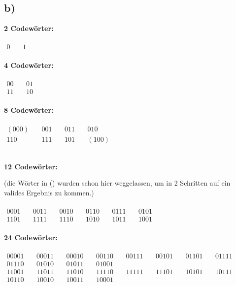 \documentclass[a4paper]{scrartcl}
\begin{document}
	\subsection{b)}
		\textbf{2 Codewörter:} \\ \\
		\(
		\begin{array}{ccc}
			0&\ & 1
		\end{array}
		\)\\ \\
		\textbf{4 Codewörter:} \\ \\
		\(
		\begin{array}{ccc}
			00&\ & 01 \\
			11&\ & 10 
		\end{array}
		\)\\ \\
		\textbf{8 Codewörter:} \\ \\
		\(
		\begin{array}{ccccccc}
			(000)&\ & 001 &\ & 011&\ & 010 \\
			110&\ & 111 &\ & 101&\ & (100) 
		\end{array}
		\)\\ \\
		\newpage
		\begin{flushleft}
			\textbf{12 Codewörter:} \\
		\end{flushleft}		
		(die Wörter in () wurden schon hier weggelassen, um in 2 Schritten 
		auf ein valides Ergebnis zu kommen.) \\ \\
		\(
		\begin{array}{ccccccccccccc}
			0001&\ & 0011&\	& 0010 &\ & 0110&\ &0111&\ & 0101 \\
			1101&\ & 1111&\ & 1110 &\ & 1010&\ &1011&\ & 1001
		\end{array}
		\)\\ \\
		\textbf{24 Codewörter:} \\ \\
		\(
		\begin{array}{cccccccccccccccccccccccccccccccccccccc}
			00001&\ &00011&\ &00010&\ &00110&\ &00111&\ &00101&\ &01101&\ &01111 \\
			01110&\ &01010&\ &01011&\ &01001 \\
			11001&\ &11011&\ &11010&\ &11110&\ &11111&\ &11101&\ &10101&\ &10111 \\
			10110&\ &10010&\ &10011&\ &10001 \\
		\end{array}
		\)
		
\end{document}
